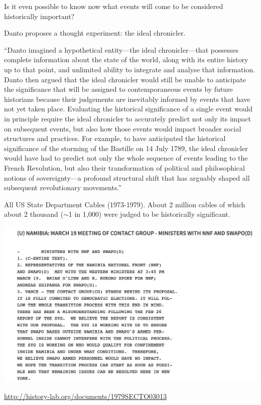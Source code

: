\documentclass[aspectratio=169]{beamer}
\begin{document}
\begin{frame}
{Is it even possible to know now what events will come to be considered historically important?

Danto proposes a thought experiment: the ideal chronicler.

``Danto imagined a hypothetical entity—the ideal chronicler—that possesses complete information about the state of the world, along with its entire history up to that point, and unlimited ability to integrate and analyse that information. Danto then argued that the ideal chronicler would still be unable to anticipate the significance that will be assigned to contemporaneous events by future historians because their judgements are inevitably informed by events that have not yet taken place. Evaluating the historical significance of a single event would in principle require the ideal chronicler to accurately predict not only its impact on subsequent events, but also how those events would impact broader social structures and practices. For example, to have anticipated the historical significance of the storming of the Bastille on 14 July 1789, the ideal chronicler would have had to predict not only the whole sequence of events leading to the French Revolution, but also their transformation of political and philosophical notions of sovereignty—a profound structural shift that has arguably shaped all subsequent revolutionary movements.''

}
\end{frame}
\begin{frame}

All US State Department Cables (1973-1979). About 2 million cables of which about 2 thousand ($\sim$1 in 1,000) were judged to be historically significant.
\pause

\begin{center}
\includegraphics[height=0.5\textheight]{figures/cable_1979SECTO03013}
\end{center}

\vfill

\tiny{\url{http://history-lab.org/documents/1979SECTO03013}}

\end{frame}
\end{document}

